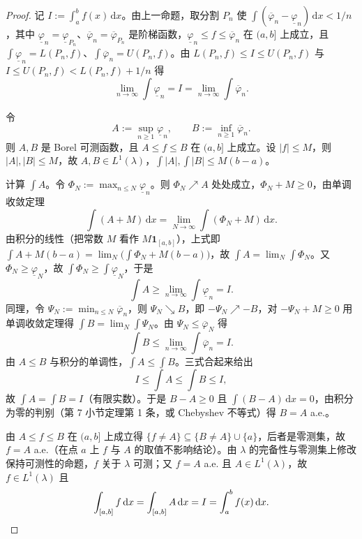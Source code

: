 \documentclass[oneside]{book}
\theoremstyle{definition}
\newcommand{\dd}{\mathrm{d}}
\theoremstyle{definition}
\begin{document}
	\begin{proof}
		记 $I:=\int_a^b f(x)\,\dd x$。由上一命题，取分割 $P_n$ 使 $\int(\overline{\varphi}_n-\underline{\varphi}_n)\,\dd x<1/n$，其中 $\underline{\varphi}_n=\underline{\varphi}_{P_n}$、$\overline{\varphi}_n=\overline{\varphi}_{P_n}$ 是阶梯函数，$\underline{\varphi}_n\leqslant f\leqslant\overline{\varphi}_n$ 在 $(a,b]$ 上成立，且 $\int\underline{\varphi}_n=L(P_n,f)$、$\int\overline{\varphi}_n=U(P_n,f)$。由 $L(P_n,f)\leqslant I\leqslant U(P_n,f)$ 与 $I\leqslant U(P_n,f)<L(P_n,f)+1/n$ 得
		\[
		\lim_{n\to\infty}\int\underline{\varphi}_n=I=\lim_{n\to\infty}\int\overline{\varphi}_n .
		\]
		
		令
		\[
		A:=\sup_{n\geqslant1}\underline{\varphi}_n,\qquad B:=\inf_{n\geqslant1}\overline{\varphi}_n .
		\]
		则 $A,B$ 是 Borel 可测函数，且 $A\leqslant f\leqslant B$ 在 $(a,b]$ 上成立。设 $|f|\leqslant M$，则 $|A|,|B|\leqslant M$，故 $A,B\in L^{1}(\lambda)$，$\int|A|,\int|B|\leqslant M(b-a)$。
		
		计算 $\int A$。令 $\Phi_N:=\max_{n\leqslant N}\underline{\varphi}_n$。则 $\Phi_N\nearrow A$ 处处成立，$\Phi_N+M\geqslant0$，由单调收敛定理
		\[
		\int(A+M)\,\dd x=\lim_{N\to\infty}\int(\Phi_N+M)\,\dd x .
		\]
		由积分的线性（把常数 $M$ 看作 $M\mathbf{1}_{[a,b]}$），上式即 $\int A+M(b-a)=\lim_N\bigl(\int\Phi_N+M(b-a)\bigr)$，故 $\int A=\lim_N\int\Phi_N$。又 $\Phi_N\geqslant\underline{\varphi}_N$，故 $\int\Phi_N\geqslant\int\underline{\varphi}_N$，于是
		\[
		\int A\geqslant\lim_{n\to\infty}\int\underline{\varphi}_n=I .
		\]
		同理，令 $\Psi_N:=\min_{n\leqslant N}\overline{\varphi}_n$，则 $\Psi_N\searrow B$，即 $-\Psi_N\nearrow-B$，对 $-\Psi_N+M\geqslant0$ 用单调收敛定理得 $\int B=\lim_N\int\Psi_N$。由 $\Psi_N\leqslant\overline{\varphi}_N$ 得
		\[
		\int B\leqslant\lim_{n\to\infty}\int\overline{\varphi}_n=I .
		\]
		由 $A\leqslant B$ 与积分的单调性，$\int A\leqslant\int B$。三式合起来给出
		\[
		I\leqslant\int A\leqslant\int B\leqslant I ,
		\]
		故 $\int A=\int B=I$（有限实数）。于是 $B-A\geqslant0$ 且 $\int(B-A)\,\dd x=0$，由积分为零的判别（第 7 小节定理第 1 条，或 Chebyshev 不等式）得 $B=A$ a.e.。
		
		由 $A\leqslant f\leqslant B$ 在 $(a,b]$ 上成立得 $\{f\neq A\}\subseteq\{B\neq A\}\cup\{a\}$，后者是零测集，故 $f=A$ a.e.（在点 $a$ 上 $f$ 与 $A$ 的取值不影响结论）。由 $\lambda$ 的完备性与零测集上修改保持可测性的命题，$f$ 关于 $\lambda$ 可测；又 $f=A$ a.e. 且 $A\in L^{1}(\lambda)$，故 $f\in L^{1}(\lambda)$ 且
		\[
		\int_{[a,b]}f\,\dd x=\int_{[a,b]}A\,\dd x=I=\int_a^b f(x)\,\dd x .\qedhere
		\]
	\end{proof}
	
\end{document}
